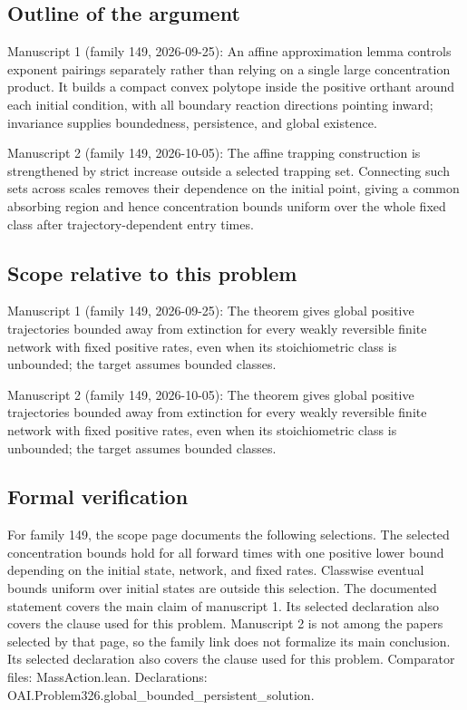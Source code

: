 \documentclass[11pt]{article}
\begin{document}
\subsection{Outline of the argument}
Manuscript 1 (family 149, 2026-09-25): An affine approximation lemma controls exponent pairings separately rather than relying on a single large concentration product. It builds a compact convex polytope inside the positive orthant around each initial condition, with all boundary reaction directions pointing inward; invariance supplies boundedness, persistence, and global existence.

Manuscript 2 (family 149, 2026-10-05): The affine trapping construction is strengthened by strict increase outside a selected trapping set. Connecting such sets across scales removes their dependence on the initial point, giving a common absorbing region and hence concentration bounds uniform over the whole fixed class after trajectory-dependent entry times.

\subsection{Scope relative to this problem}
Manuscript 1 (family 149, 2026-09-25): The theorem gives global positive trajectories bounded away from extinction for every weakly reversible finite network with fixed positive rates, even when its stoichiometric class is unbounded; the target assumes bounded classes.

Manuscript 2 (family 149, 2026-10-05): The theorem gives global positive trajectories bounded away from extinction for every weakly reversible finite network with fixed positive rates, even when its stoichiometric class is unbounded; the target assumes bounded classes.

\subsection{Formal verification}
For family 149, the scope page documents the following selections. The selected concentration bounds hold for all forward times with one positive lower bound depending on the initial state, network, and fixed rates. Classwise eventual bounds uniform over initial states are outside this selection. The documented statement covers the main claim of manuscript 1. Its selected declaration also covers the clause used for this problem. Manuscript 2 is not among the papers selected by that page, so the family link does not formalize its main conclusion. Its selected declaration also covers the clause used for this problem. Comparator files: MassAction.lean. Declarations: OAI.Problem326.global\_bounded\_persistent\_solution.
\end{document}
